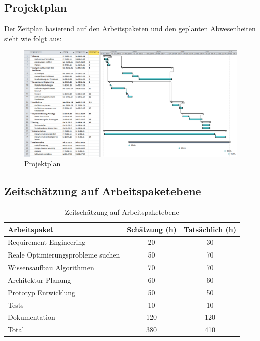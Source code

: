 \begin{landscape}
\thispagestyle{empty}
\subsection{Projektplan}\label{projektplan}
Der Zeitplan basierend auf den Arbeitspaketen und den geplanten Abwesenheiten sieht wie folgt aus:
\begin{figure}[h]
\centering
\includegraphics[scale=0.5]{images/project/projectplan.png}
\caption{Projektplan}
\label{fig:psp}
\end{figure}

\end{landscape}

\subsection{Zeitschätzung auf Arbeitspaketebene}
\begin{table}[ht]
\centering
  \begin{tabular}{ l | c | c }
	\hline
	\rowcolor{gray}
	\textbf{Arbeitspaket}					&	\textbf{Schätzung (h)}	& \textbf{Tatsächlich (h)}	\\ \hline
	Requirement Engineering					&	20			& 30	\\ \hline
	Reale Optimierungsprobleme suchen			&	50			& 70	\\ \hline
	Wissensaufbau Algorithmen				&	70			& 70	\\ \hline
	Architektur Planung						&	60			& 60	\\ \hline
	Prototyp Entwicklung					&	50			& 50	\\ \hline
	Tests								&	10			& 10	\\ \hline
	Dokumentation						&	120			& 120	\\ \hline \hline
	Total								&	380			& 410	\\ \hline
  \end{tabular}
   \caption{Zeitschätzung auf Arbeitspaketebene}\label{table:time_estimation}
\end{table}

